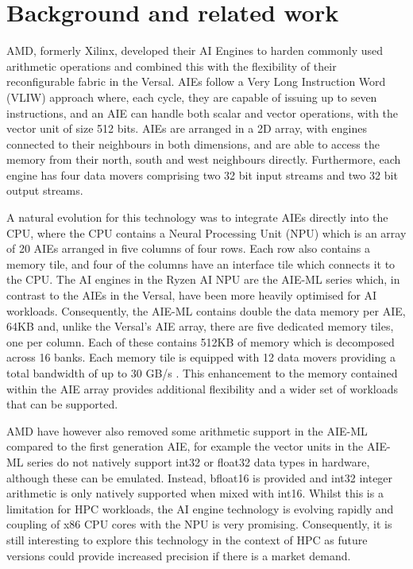 \section{Background and related work}
\label{sec:bg}


AMD, formerly Xilinx, developed their AI Engines to harden commonly used arithmetic operations and combined this with the flexibility of their reconfigurable fabric in the Versal. AIEs follow a Very Long Instruction Word (VLIW) approach where, each cycle, they are capable of issuing up to seven instructions, and an AIE can handle both scalar and vector operations, with the vector unit of size 512 bits. AIEs are arranged in a 2D array, with engines connected to their neighbours in both dimensions, and are able to access the memory from their north, south and west neighbours directly. Furthermore, each engine has four data movers comprising two 32 bit input streams and two 32 bit output streams.

A natural evolution for this technology was to integrate AIEs directly into the CPU, where the CPU contains a Neural Processing Unit (NPU) which is an array of 20 AIEs arranged in five columns of four rows. Each row also contains a memory tile, and four of the columns have an interface tile which connects it to the CPU. The AI engines in the Ryzen AI NPU are the AIE-ML series which, in contrast to the AIEs in the Versal, have been more heavily optimised for AI workloads. Consequently, the AIE-ML contains double the data memory per AIE, 64KB and, unlike the Versal's AIE array, there are five dedicated memory tiles, one per column. Each of these contains 512KB of memory which is decomposed across 16 banks. Each memory tile is equipped with 12 data movers providing a total bandwidth of up to 30 GB/s \cite{aie-ml}. This enhancement to the memory contained within the AIE array provides additional flexibility and a wider set of workloads that can be supported.

AMD have however also removed some arithmetic support in the AIE-ML compared to the first generation AIE, for example the vector units in the AIE-ML series do not natively support int32 or float32 data types in hardware, although these can be emulated. Instead, bfloat16 is provided and int32 integer arithmetic is only natively supported when mixed with int16. Whilst this is a limitation for HPC workloads, the AI engine technology is evolving rapidly and coupling of x86 CPU cores with the NPU is very promising. Consequently, it is still interesting to explore this technology in the context of HPC as future versions could provide increased precision if there is a market demand.

